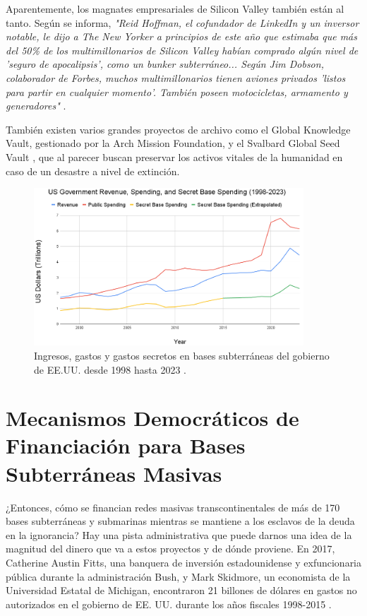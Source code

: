 \documentclass[10pt,twocolumn,letterpaper]{article}
\begin{document}
Aparentemente, los magnates empresariales de Silicon Valley también están al tanto. Según se informa, \textit{"Reid Hoffman, el cofundador de LinkedIn y un inversor notable, le dijo a The New Yorker a principios de este año que estimaba que más del 50\% de los multimillonarios de Silicon Valley habían comprado algún nivel de 'seguro de apocalipsis', como un bunker subterráneo... Según Jim Dobson, colaborador de Forbes, muchos multimillonarios tienen aviones privados 'listos para partir en cualquier momento'. También poseen motocicletas, armamento y generadores"} \cite{28}.

También existen varios grandes proyectos de archivo como el Global Knowledge Vault, gestionado por la Arch Mission Foundation, \cite{29} y el Svalbard Global Seed Vault \cite{30}, que al parecer buscan preservar los activos vitales de la humanidad en caso de un desastre a nivel de extinción.

\begin{figure}[t]
\begin{center}
\includegraphics[width=0.9\textwidth]{govcrop2.png}
\end{center}
   \caption{Ingresos, gastos y gastos secretos en bases subterráneas del gobierno de EE.UU. desde 1998 hasta 2023 \cite{19}.}
   \label{fig:9}
\end{figure}
\section{Mecanismos Democráticos de Financiación para Bases Subterráneas Masivas}

¿Entonces, cómo se financian redes masivas transcontinentales de más de 170 bases subterráneas y submarinas mientras se mantiene a los esclavos de la deuda en la ignorancia? Hay una pista administrativa que puede darnos una idea de la magnitud del dinero que va a estos proyectos y de dónde proviene. En 2017, Catherine Austin Fitts, una banquera de inversión estadounidense y exfuncionaria pública durante la administración Bush, y Mark Skidmore, un economista de la Universidad Estatal de Michigan, encontraron 21 billones de dólares en gastos no autorizados en el gobierno de EE. UU. durante los años fiscales 1998-2015 \cite{11,12,13}.
\end{document}
